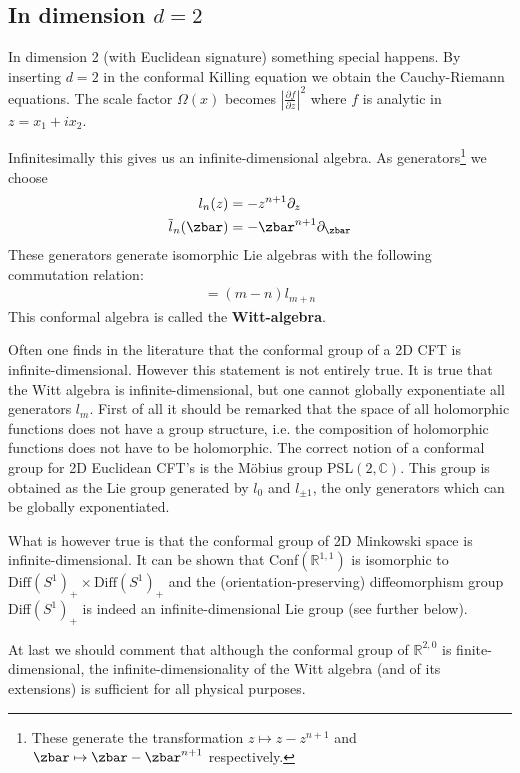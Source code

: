 \subsection{In dimension $d=2$}

	In dimension 2 (with Euclidean signature) something special happens. By inserting $d=2$ in the conformal Killing equation we obtain the Cauchy-Riemann equations. The scale factor $\Omega(x)$ becomes $\left|\frac{\partial f}{\partial z}\right|^2$ where $f$ is analytic in $z = x_1+ix_2$.

	Infinitesimally this gives us an infinite-dimensional algebra. As generators\footnote{These generate the transformation $z\mapsto z-z^{n+1}$ and $\zbar\mapsto\zbar-\zbar^{n+1}$ respectively.} we choose
	\begin{align}
		l_n(z) &= -z^{n+1}\partial_z\\
		\overline{l}_n(\zbar)&=-\zbar^{n+1}\partial_{\zbar}
	\end{align}
	These generators generate isomorphic Lie algebras with the following commutation relation:
	\begin{gather}
		[l_m, l_n] = (m-n)l_{m+n}
	\end{gather}
	This conformal algebra is called the \textbf{Witt-algebra}.
	
	
	\begin{remark}
		Often one finds in the literature that the conformal group of a 2D CFT is infinite-dimensional. However this statement is not entirely true. It is true that the Witt algebra is infinite-dimensional, but one cannot globally exponentiate all generators $l_m$. First of all it should be remarked that the space of all holomorphic functions does not have a group structure, i.e. the composition of holomorphic functions does not have to be holomorphic. The correct notion of a conformal group for 2D Euclidean CFT's is the M\"obius group PSL$(2, \mathbb{C})$. This group is obtained as the Lie group generated by $l_0$ and $l_{\pm1}$, the only generators which can be globally exponentiated.
		
		What is however true is that the conformal group of 2D Minkowski space is infinite-dimensional. It can be shown that Conf$(\mathbb{R}^{1, 1})$ is isomorphic to $\text{Diff}(S^1)_+\times\text{Diff}(S^1)_+$ and the (orientation-preserving) diffeomorphism group Diff$(S^1)_+$ is indeed an infinite-dimensional Lie group (see further below).
		
		At last we should comment that although the conformal group of $\mathbb{R}^{2, 0}$ is finite-dimensional, the infinite-dimensionality of the Witt algebra (and of its extensions) is sufficient for all physical purposes.
	\end{remark}

